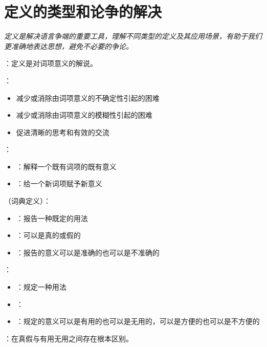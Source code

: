 \section{定义的类型和论争的解决}

\begin{logicbox}[title=引言]
\textit{定义是解决语言争端的重要工具，理解不同类型的定义及其应用场景，有助于我们更准确地表达思想，避免不必要的争论。}
\end{logicbox}

\begin{theorembox}[title=定义的基本概念与功能]
：定义是对词项意义的解说。

：
\begin{itemize}
  \item 减少或消除由词项意义的不确定性引起的困难
  \item 减少或消除由词项意义的模糊性引起的困难
  \item 促进清晰的思考和有效的交流
\end{itemize}

：
\begin{itemize}
  \item {}：解释一个既有词项的既有意义
  \item {}：给一个新词项赋予新意义
\end{itemize}
\end{theorembox}

\begin{theorembox}[title=报告与规定的根本区别]
（词典定义）：
\begin{itemize}
  \item {}：报告一种既定的用法
  \item {}：可以是真的或假的
  \item {}：报告的意义可以是准确的也可以是不准确的
\end{itemize}

：
\begin{itemize}
  \item {}：规定一种用法
  \item {}：
  \item {}：规定的意义可以是有用的也可以是无用的，可以是方便的也可以是不方便的
\end{itemize}

：在真假与有用无用之间存在根本区别。
\end{theorembox}

